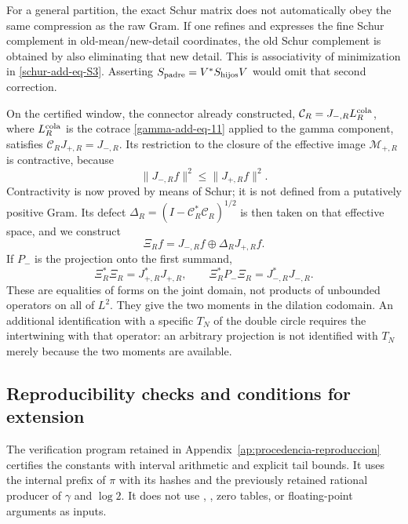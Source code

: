 For a general partition, the exact Schur matrix does not automatically
obey the same compression as the raw Gram. If one refines and expresses the
fine Schur complement in old-mean/new-detail coordinates, the old Schur
complement is obtained by also eliminating that new detail. This is
associativity of minimization in \eqref{schur-add-eq-S3}. Asserting
\(S_{\rm padre}=V^*S_{\rm hijos}V\) would omit that second correction.

On the certified window, the connector already constructed,
\(\mathcal C_R=J_{-,R}L_R^{\rm cola}\), where
\(L_R^{\rm cola}\) is the cotrace
\eqref{gamma-add-eq-11} applied to the gamma component, satisfies
\(\mathcal C_RJ_{+,R}=J_{-,R}\). Its restriction to the closure of the
effective image \(\mathcal M_{+,R}\) is contractive, because
\begin{equation}
\|J_{-,R}f\|^2\leq\|J_{+,R}f\|^2.
\label{schur-add-display-31}
\end{equation}
Contractivity is now proved by means of Schur; it is not defined
from a putatively positive Gram. Its defect
\(\Delta_R=(I-\mathcal C_R^*\mathcal C_R)^{1/2}\) is then taken on that
effective space, and we construct
\begin{equation}
\Xi_Rf=J_{-,R}f\oplus\Delta_RJ_{+,R}f.
\label{schur-add-display-32}
\end{equation}
If \(P_-\) is the projection onto the first summand,
\begin{equation}
\Xi_R^*\Xi_R=J_{+,R}^*J_{+,R},\qquad
\Xi_R^*P_-\Xi_R=J_{-,R}^*J_{-,R}.
\label{schur-add-display-33}
\end{equation}
These are equalities of forms on the joint domain, not products of
unbounded operators on all of \(L^2\). They give the two moments in
the dilation codomain. An additional identification with a
specific \(T_N\) of the double circle requires the intertwining
with that operator: an arbitrary projection is not identified with
\(T_N\) merely because the two moments are available.

\subsection{Reproducibility checks and conditions for extension}
\label{schur-add-sub-411}

The verification program retained in
Appendix~\ref{ap:procedencia-reproduccion} certifies the constants with interval arithmetic and explicit
tail bounds. It uses the internal prefix of \(\pi\) with its hashes and the
previously retained rational producer of \(\gamma\) and \(\log2\). It does not use \texttt{},
\texttt{}, zero tables, or floating-point arguments as inputs.

